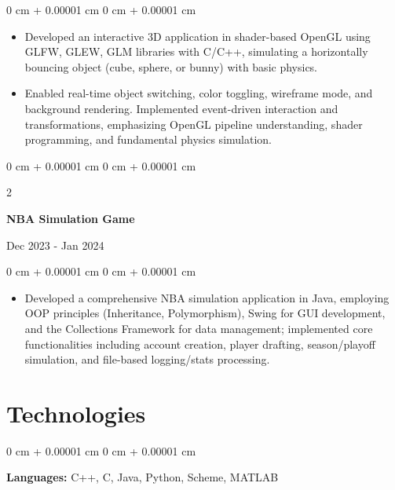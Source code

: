 \documentclass[10pt, letterpaper]{article}
\newenvironment{highlights}{
    \begin{itemize}[
        topsep=0.10 cm,
        parsep=0.10 cm,
        partopsep=0pt,
        itemsep=0pt,
        leftmargin=0 cm + 10pt
    ]
}{
    \end{itemize}
} %
\newenvironment{onecolentry}{
    \begin{adjustwidth}{
        0 cm + 0.00001 cm
    }{
        0 cm + 0.00001 cm
    }
}{
    \end{adjustwidth}
} %
\newenvironment{twocolentry}[2][]{
    \onecolentry
    \def\secondColumn{#2}
    \setcolumnwidth{\fill, 4.5 cm}
    \begin{paracol}{2}
}{
    \switchcolumn \raggedleft \secondColumn
    \end{paracol}
    \endonecolentry
} %
\begin{document}
        \vspace{0.10 cm}
        \begin{onecolentry}
            \begin{highlights}
                \item Developed an interactive 3D application in shader-based OpenGL using GLFW, GLEW, GLM libraries with C/C++, simulating a horizontally bouncing object (cube, sphere, or bunny) with basic physics. 
                \item Enabled real-time object switching, color toggling, wireframe mode, and background rendering. Implemented event-driven interaction and transformations, emphasizing OpenGL pipeline understanding, shader programming, and fundamental physics simulation.
            \end{highlights}
        \end{onecolentry}

        \vspace{0.2 cm}

        \begin{twocolentry}{
            Dec 2023 - Jan 2024
        }
            \textbf{NBA Simulation Game}
            \end{twocolentry}

        \vspace{0.10 cm}
        \begin{onecolentry}
            \begin{highlights}
                \item Developed a comprehensive NBA simulation application in Java, employing OOP principles (Inheritance, Polymorphism), Swing for GUI development, and the Collections Framework for data management; implemented core functionalities including account creation, player drafting, season/playoff simulation, and file-based logging/stats processing.     
            \end{highlights}
        \end{onecolentry}


    
    \section{Technologies}



        
        \begin{onecolentry}
            \textbf{
            Languages:} C++, C, Java, Python, Scheme, MATLAB  \end{onecolentry}
\end{document}
